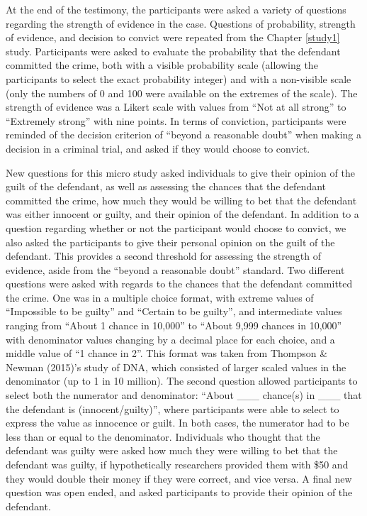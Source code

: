 \documentclass[print]{nuthesis}
\begin{document}
At the end of the testimony, the participants were asked a variety of questions regarding the strength of evidence in the case.
Questions of probability, strength of evidence, and decision to convict were repeated from the Chapter \ref{study1} study.
Participants were asked to evaluate the probability that the defendant committed the crime, both with a visible probability scale (allowing the participants to select the exact probability integer) and with a non-visible scale (only the numbers of 0 and 100 were available on the extremes of the scale).
The strength of evidence was a Likert scale with values from ``Not at all strong'' to ``Extremely strong'' with nine points.
In terms of conviction, participants were reminded of the decision criterion of ``beyond a reasonable doubt'' when making a decision in a criminal trial, and asked if they would choose to convict.

New questions for this micro study asked individuals to give their opinion of the guilt of the defendant, as well as assessing the chances that the defendant committed the crime, how much they would be willing to bet that the defendant was either innocent or guilty, and their opinion of the defendant.
In addition to a question regarding whether or not the participant would choose to convict, we also asked the participants to give their personal opinion on the guilt of the defendant.
This provides a second threshold for assessing the strength of evidence, aside from the ``beyond a reasonable doubt'' standard.
Two different questions were asked with regards to the chances that the defendant committed the crime.
One was in a multiple choice format, with extreme values of ``Impossible to be guilty'' and ``Certain to be guilty'', and intermediate values ranging from ``About 1 chance in 10,000'' to ``About 9,999 chances in 10,000'' with denominator values changing by a decimal place for each choice, and a middle value of ``1 chance in 2''.
This format was taken from Thompson \& Newman (2015)'s study of DNA, which consisted of larger scaled values in the denominator (up to 1 in 10 million).
The second question allowed participants to select both the numerator and denominator: ``About \_\_\_ chance(s) in \_\_\_ that the defendant is (innocent/guilty)'', where participants were able to select to express the value as innocence or guilt.
In both cases, the numerator had to be less than or equal to the denominator.
Individuals who thought that the defendant was guilty were asked how much they were willing to bet that the defendant was guilty, if hypothetically researchers provided them with \$50 and they would double their money if they were correct, and vice versa.
A final new question was open ended, and asked participants to provide their opinion of the defendant.
\end{document}
